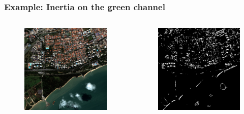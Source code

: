 \documentclass[compress]{beamer}
\begin{document}
\begin{frame}
\frametitle{Example: Inertia on the green channel}
\begin{columns}
\begin{column}{0.5\textwidth}
\begin{figure}[]
  \includegraphics[width=1.0\textwidth]{radio2-extract-3b.jpg}
\end{figure}
\end{column}
\begin{column}{0.5\textwidth}
\begin{figure}[]
  \includegraphics[width=1.0\textwidth]{Texture-Inertia-R2-2-O1-1-C1.jpg}
\end{figure}
\end{column}
\end{columns}
\end{frame}
\end{document}
